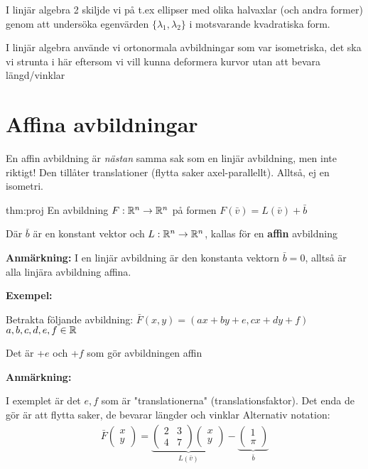 \noindent I linjär algebra 2 skiljde vi på t.ex ellipser med olika halvaxlar (och andra former) genom att undersöka egenvärden $\{\lambda_1, \lambda_2\}$ i motsvarande kvadratiska form.\par
\noindent I linjär algebra använde vi ortonormala avbildningar som var isometriska, det ska vi strunta i här eftersom vi vill kunna deformera kurvor utan att bevara längd/vinklar
\par\bigskip
\section{Affina avbildningar}
\par\bigskip
\noindent En affin avbildning är \textit{nästan} samma sak som en linjär avbildning, men inte riktigt! Den tillåter translationer (flytta saker axel-parallellt). Alltså, ej en isometri.
\par\bigskip
\begin{theo}{thm:proj}
  En avbildning $F:\mathbb{R}^n\to\mathbb{R}^n$ på formen $F(\bar{v}) = L(\bar{v})+\bar{b}$\par
  \noindent Där $\bar{b}$ är en konstant vektor och $L:\mathbb{R}^n\to\mathbb{R}^n$, kallas för en \textbf{affin} avbildning
\end{theo}
\par\bigskip
\noindent\textbf{Anmärkning:}
\noindent I en linjär avbildning är den konstanta vektorn $\bar{b} = 0$, alltså är alla linjära avbildning affina.
\par\bigskip
\noindent\textbf{Exempel:}\par
\noindent Betrakta följande avbildning: $\bar{F}(x,y) = (ax+by+e, cx+dy+f)$ $a,b,c,d,e,f\in\mathbb{R}$\par
\noindent Det är +$e$ och +$f$ som gör avbildningen affin\par
\par\bigskip
\noindent\textbf{Anmärkning:}\par
\noindent I exemplet är det $e,f$ som är "translationerna" (translationsfaktor). Det enda de gör är att flytta saker, de bevarar längder och vinklar
\noindent Alternativ notation:
\begin{equation*}
  \begin{gathered}
    \bar{F}\begin{pmatrix}x\\y\end{pmatrix} = \underbrace{\begin{pmatrix}2&3\\4&7\end{pmatrix}\begin{pmatrix}x\\y\end{pmatrix}}_{\text{$L(\bar{v})$}}-\underbrace{\begin{pmatrix}1\\\pi\end{pmatrix}}_{\text{$\bar{b}$}}
  \end{gathered}
\end{equation*}
